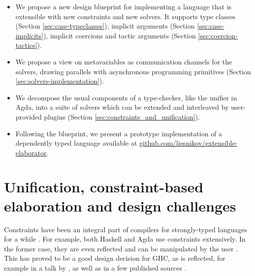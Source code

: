 \documentclass[
  sigconf,
  screen,
  review]{acmart}
\providecommand{\tightlist}{%
  \setlength{\itemsep}{0pt}\setlength{\parskip}{0pt}}
\begin{document}
\begin{itemize}
\tightlist
\item
  We propose a new design blueprint for implementing a language that is
  extensible with new constraints and new solvers. It supports type
  classes (Section \ref{sec:case-typeclasses}), implicit arguments
  (Section \ref{sec:case-implicits}), implicit coercions and tactic
  arguments (Section \ref{sec:coercion-tactics}).
\item
  We propose a view on metavariables as communication channels for the
  solvers, drawing parallels with asynchronous programming primitives
  (Section \ref{sec:solvers-implementation}).
\item
  We decompose the usual components of a type-checker, like the unifier
  in Agda, into a suite of solvers which can be extended and interleaved
  by user-provided plugins (Section
  \ref{sec:constraints_and_unification}).
\item
  Following the blueprint, we present a prototype implementation of a
  dependently typed language available at
  \href{https://github.com/liesnikov/extensible-elaborator}{github.com/liesnikov/extensible-elaborator}.
\end{itemize}

\hypertarget{sec:unification_constraint_based_elaboration_and_design_challanges}{%
\section{Unification, constraint-based elaboration and design
challenges}\label{sec:unification_constraint_based_elaboration_and_design_challanges}}

Constraints have been an integral part of compilers for strongly-typed
languages for a while \citep{oderskyTypeInferenceConstrained1999}. For
example, both Haskell \citep{vytiniotisOutsideInModularType2011} and
Agda \citep[ chap.~3]{norellPracticalProgrammingLanguage2007} use
constraints extensively. In the former case, they are even reflected and
can be manipulated by the user
\citep[chap.~6.10.3]{orchardHaskellTypeConstraints2010a, ghcdevelopmentteamGHCUserGuide2022}.
This has proved to be a good design decision for GHC, as is reflected,
for example in a talk by \citet{peytonjonesTypeInferenceConstraint2019},
as well as in a few published sources
\citep{vytiniotisOutsideInModularType2011, peytonjonesPracticalTypeInference2007}.
\end{document}
